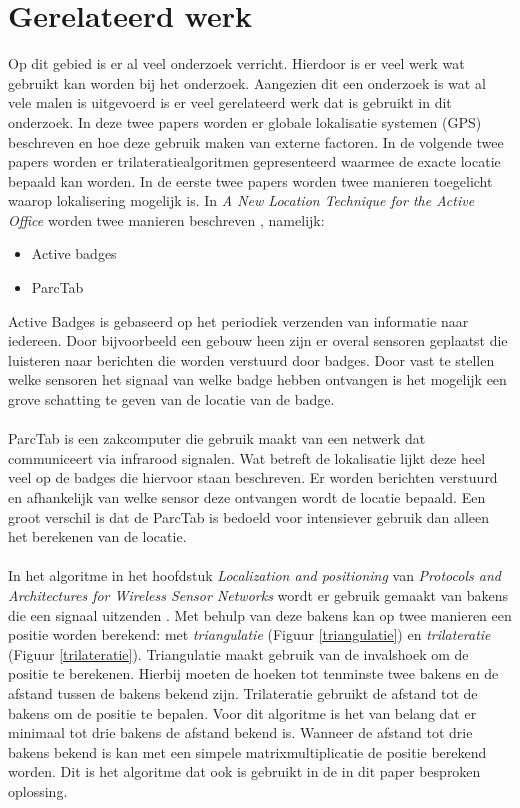 \documentclass{article}
\begin{document}
\section{Gerelateerd werk}
Op dit gebied is er al veel onderzoek verricht. Hierdoor is er veel werk wat gebruikt kan worden bij het onderzoek. Aangezien dit een onderzoek is wat al vele malen is uitgevoerd is er veel gerelateerd werk dat is gebruikt in dit onderzoek. In deze twee papers worden er globale lokalisatie systemen (GPS) beschreven en hoe deze gebruik maken van externe factoren. In de volgende twee papers worden er trilateratiealgoritmen gepresenteerd waarmee de exacte locatie bepaald kan worden. In de eerste twee papers worden twee manieren toegelicht waarop lokalisering mogelijk is. In \textit{A New Location Technique for the Active Office} worden twee manieren beschreven \cite{ward97}, namelijk:
\begin{itemize}
	\item Active badges
	\item ParcTab
\end{itemize}
Active Badges is gebaseerd op het periodiek verzenden van informatie naar iedereen. Door bijvoorbeeld een gebouw heen zijn er overal sensoren geplaatst die luisteren naar berichten die worden verstuurd door badges. Door vast te stellen welke sensoren het signaal van welke badge hebben ontvangen is het mogelijk een grove schatting te geven van de locatie van de badge.\\
\\
ParcTab is een zakcomputer die gebruik maakt van een netwerk dat communiceert via infrarood signalen. Wat betreft de lokalisatie lijkt deze heel veel op de badges die hiervoor staan beschreven. Er worden berichten verstuurd en afhankelijk van welke sensor deze ontvangen wordt de locatie bepaald. Een groot verschil is dat de ParcTab is bedoeld voor intensiever gebruik dan alleen het berekenen van de locatie. \\
\\
In het algoritme in het hoofdstuk \textit{Localization and positioning} van \textit{Protocols and Architectures for Wireless Sensor Networks} wordt er gebruik gemaakt van bakens die een signaal uitzenden \cite{h9}. Met behulp van deze bakens kan op twee manieren een positie worden berekend: met \emph{triangulatie} (Figuur \ref{triangulatie}) en \emph{trilateratie} (Figuur \ref{trilateratie}). Triangulatie maakt gebruik van de invalshoek om de positie te berekenen. Hierbij moeten de hoeken tot tenminste twee bakens en de afstand tussen de bakens bekend zijn. Trilateratie gebruikt de afstand tot de bakens om de positie te bepalen. Voor dit algoritme is het van belang dat er minimaal tot drie bakens de afstand bekend is. Wanneer de afstand tot drie bakens bekend is kan met een simpele matrixmultiplicatie de positie berekend worden. Dit is het algoritme dat ook is gebruikt in de in dit paper besproken oplossing.
\end{document}
